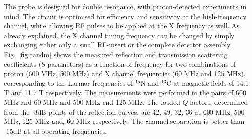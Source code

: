 \documentclass[preprint,5p]{elsarticle}
\newcommand{\fig}[1]{Fig.~\ref{#1}}
\begin{document}
The probe is designed for double resonance, with proton-detected experiments in mind. The circuit is optimised
for efficiency and sensitivity at the high-frequency channel, while allowing RF pulses to be applied
at the X frequency as well. As already explained, the X channel tuning frequency can be changed by simply
 exchanging either only a small RF-insert or the complete detector assembly. 
 \fig{fig:tandm} shows the measured reflection and transmission scattering coefficients ($S$-parameters) as a 
 function of frequency for two combinations of 
 proton (600 MHz, 500 MHz) and X channel frequencies (60 MHz and 125 MHz), 
 corresponding to the Larmor frequencies of $^{15}$N and $^{13}$C at magnetic fields of 14.1 T and 11.7 T respectively. 
 The measurements were performed in the pairs of 600 MHz and 60 MHz and 500 MHz and 125 MHz. The loaded $Q$ factors,
 determined from the -3dB points of the reflection curves, are 42, 49, 32, 36 at 600 MHz, 500 MHz, 
 125 MHz and, 60 MHz respectively. The channel separation is better than -15dB at all operating frequencies.
 
\end{document}

